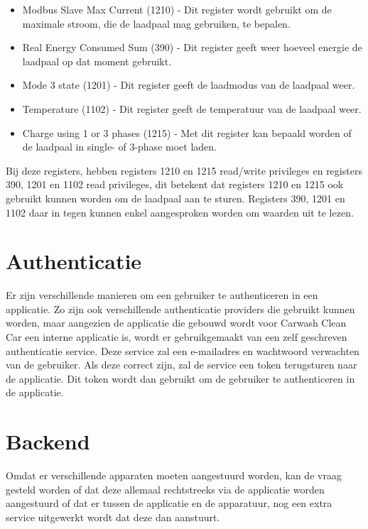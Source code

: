 \begin{itemize}
    \item Modbus Slave Max Current (1210) - Dit register wordt gebruikt om de maximale stroom, die de laadpaal mag gebruiken, te bepalen.
    \item Real Energy Consumed Sum (390) - Dit register geeft weer hoeveel energie de laadpaal op dat moment gebruikt.
    \item Mode 3 state (1201) - Dit register geeft de laadmodus van de laadpaal weer.
    \item Temperature (1102) - Dit register geeft de temperatuur van de laadpaal weer.
    \item Charge using 1 or 3 phases (1215) - Met dit register kan bepaald worden of de laadpaal in single- of 3-phase moet laden.
\end{itemize}

Bij deze registers, hebben registers 1210 en 1215 read/write privileges en registers 390, 1201 en 1102 read privileges, dit betekent dat registers 1210 en 1215 ook gebruikt kunnen worden om de laadpaal aan te sturen. Registers 390, 1201 en 1102 daar in tegen kunnen enkel aangesproken worden om waarden uit te lezen.

\section{Authenticatie}
\label{sec:stand-van-zaken-authenticatie}

Er zijn verschillende manieren om een gebruiker te authenticeren in een applicatie. Zo zijn ook verschillende authenticatie providers die gebruikt kunnen worden, maar aangezien de applicatie die gebouwd wordt voor Carwash Clean Car een interne applicatie is, wordt er gebruikgemaakt van een zelf geschreven authenticatie service. Deze service zal een e-mailadres en wachtwoord verwachten van de gebruiker. Als deze correct zijn, zal de service een token terugsturen naar de applicatie. Dit token wordt dan gebruikt om de gebruiker te authenticeren in de applicatie.

\section{Backend}
\label{sec:stand-van-zaken-backend}

Omdat er verschillende apparaten moeten aangestuurd worden, kan de vraag gesteld worden of dat deze allemaal rechtstreeks via de applicatie worden aangestuurd of dat er tussen de applicatie en de apparatuur, nog een extra service uitgewerkt wordt dat deze dan aanstuurt.\\

